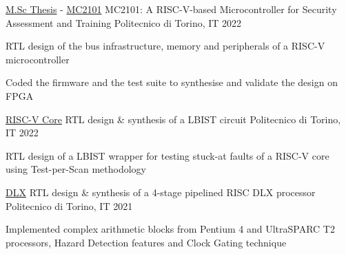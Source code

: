

\begin{cventries}

  \cventry
    {\href{https://github.com/Luca-Dalmasso/Thesis}{{\faGithubSquare} M.Sc Thesis} - \href{https://github.com/Luca-Dalmasso/mc2101}{{\faGithubSquare} MC2101}} %
    {MC2101: A RISC-V-based Microcontroller for Security Assessment and Training} %
    {Politecnico di Torino, IT} %
    {2022} %
    {
      \begin{cvitems} %
        \item{RTL design of the bus infrastructure, memory and peripherals of a RISC-V microcontroller}
        \item{Coded the firmware and the test suite to synthesise and validate the design on FPGA}
      \end{cvitems}
    }
    
  \cventry
    {\href{https://github.com/Luca-Dalmasso/RISCV_LBIST}{{\faGithubSquare} RISC-V Core}} %
    {RTL design \& synthesis of a LBIST circuit} %
    {Politecnico di Torino, IT} %
    {2022} %
    {
      \begin{cvitems} %
        \item{RTL design of a LBIST wrapper for testing stuck-at faults of a RISC-V core using Test-per-Scan methodology}
      \end{cvitems}
    }

  \cventry
    {\href{https://github.com/Luca-Dalmasso/DLX}{{\faGithubSquare} DLX}} %
    {RTL design \& synthesis of a 4-stage pipelined RISC DLX processor} %
    {Politecnico di Torino, IT} %
    {2021} %
    {
      \begin{cvitems} %
        \item{Implemented complex arithmetic blocks from Pentium 4 and UltraSPARC T2 processors, Hazard Detection features and Clock Gating technique}
      \end{cvitems}
    }

\end{cventries}
